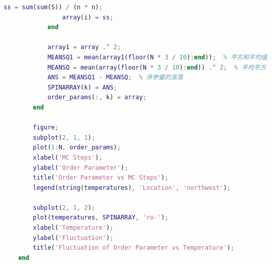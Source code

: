 \documentclass[12pt, a4paper, oneside]{ctexart}
\begin{document}
\begin{spacing}{2.0}
\begin{lstlisting}[language=Matlab, caption={代码}]
                ss = sum(sum(S)) / (n * n);
                array(i) = ss;
            end
    
            array1 = array .^ 2;
            MEANSQ1 = mean(array1(floor(N * 3 / 10):end));  % 平方和平均值
            MEANSQ = mean(array(floor(N * 3 / 10):end)) .^ 2;  % 平均平方
            ANS = MEANSQ1 - MEANSQ;  % 序参量的涨落
            SPINARRAY(k) = ANS;
            order_params(:, k) = array;
        end
    
        figure;
        subplot(2, 1, 1);
        plot(1:N, order_params);
        xlabel('MC Steps');
        ylabel('Order Parameter');
        title('Order Parameter vs MC Steps');
        legend(string(temperatures), 'Location', 'northwest');
    
        subplot(2, 1, 2);
        plot(temperatures, SPINARRAY, 'ro-');
        xlabel('Temperature');
        ylabel('Fluctuation');
        title('Fluctuation of Order Parameter vs Temperature');
    end
    
    
\end{lstlisting}



\end{spacing}{}
\end{document}
